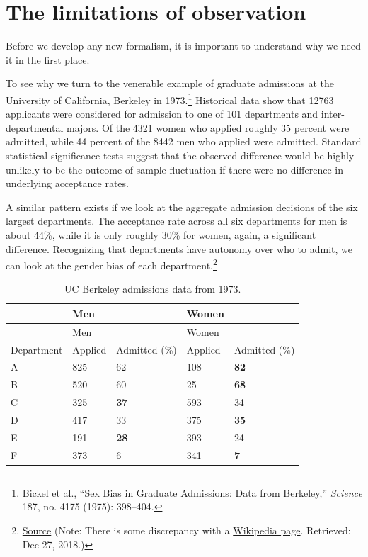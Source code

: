\documentclass{tufte-book}
\begin{document}
\hypertarget{the-limitations-of-observation}{%
\section{The limitations of
observation}\label{the-limitations-of-observation}}

Before we develop any new formalism, it is important to understand why
we need it in the first place.

To see why we turn to the venerable example of graduate admissions at
the University of California, Berkeley in
1973.\footnote{Bickel et al., {``Sex Bias in Graduate Admissions: Data
  from Berkeley,''} \emph{Science} 187, no. 4175 (1975): 398--404.}
Historical data show that 12763 applicants were considered for admission
to one of 101 departments and inter-departmental majors. Of the 4321
women who applied roughly 35 percent were admitted, while 44 percent of
the 8442 men who applied were admitted. Standard statistical
significance tests suggest that the observed difference would be highly
unlikely to be the outcome of sample fluctuation if there were no
difference in underlying acceptance rates.

A similar pattern exists if we look at the aggregate admission decisions
of the six largest departments. The acceptance rate across all six
departments for men is about 44\%, while it is only roughly 30\% for
women, again, a significant difference. Recognizing that departments
have autonomy over who to admit, we can look at the gender bias of each
department.\footnote{\href{http://www.randomservices.org/random/data/Berkeley.html}{Source}
  (Note: There is some discrepancy with a
  \href{https://en.wikipedia.org/wiki/Simpson\%27s_paradox}{Wikipedia
  page}. Retrieved: Dec 27, 2018.)}

\begin{longtable}[]{@{}lllll@{}}
\caption{UC Berkeley admissions data from 1973.}\tabularnewline
\toprule
& Men & & Women & \\
\midrule
\endfirsthead
\toprule
& Men & & Women & \\
\midrule
\endhead
Department & Applied & Admitted (\%) & Applied & Admitted (\%) \\
A & 825 & 62 & 108 & \textbf{82} \\
B & 520 & 60 & 25 & \textbf{68} \\
C & 325 & \textbf{37} & 593 & 34 \\
D & 417 & 33 & 375 & \textbf{35} \\
E & 191 & \textbf{28} & 393 & 24 \\
F & 373 & 6 & 341 & \textbf{7} \\
\bottomrule
\end{longtable}
\end{document}
